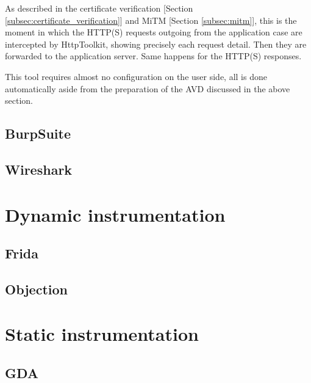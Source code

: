 			As described in the certificate verification [Section \ref{subsec:certificate_verification}] and MiTM [Section \ref{subsec:mitm}], this is the moment in which the HTTP(S) requests outgoing from the application case are intercepted by HttpToolkit, showing precisely each request detail. Then they are forwarded to the application server. Same happens for the HTTP(S) responses.
			\par This tool requires almost no configuration on the user side, all is done automatically aside from the preparation of the AVD discussed in the above section.
		
		\subsection{BurpSuite}
		\label{sec:burp_suite}
		
		\subsection{Wireshark}
		\label{sec:wireshark}
		
	
	\section{Dynamic instrumentation}
		\subsection{Frida}
		\subsection{Objection}
		
	\section{Static instrumentation}
		\subsection{GDA}
